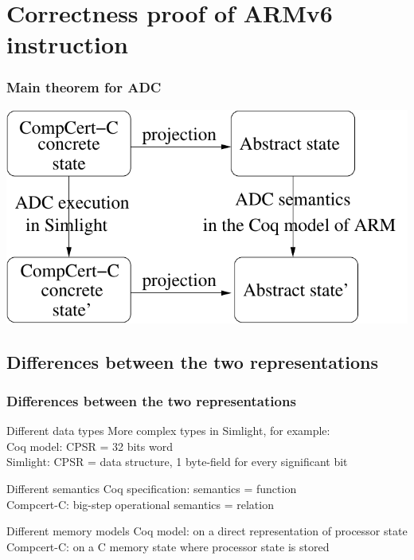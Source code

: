 \documentclass[usenames,dvipsnames]{beamer} %
\begin{document}
\section{Correctness proof of ARMv6 instruction}



\begin{frame}
\frametitle{Main theorem for ADC}
\hfil\includegraphics[width=.85\linewidth]{fig/theorem.pdf}
\end{frame}

\subsection{Differences between the two representations}
\begin{frame}
\frametitle{Differences between the two representations}
\begin{block}{Different data types}
More complex types in Simlight, for example:\\
Coq model: CPSR = 32 bits word\\
Simlight: CPSR = data structure, 1 byte-field for every significant bit
\end{block}
\begin{block}{Different semantics}
Coq specification: semantics = function\\
Compcert-C: big-step operational semantics = relation
\end{block}
\begin{block}{Different memory models}
Coq model: on a direct representation of processor state\\
Compcert-C: on a C memory state where processor state is stored
\end{block}
\end{frame}
\end{document}
